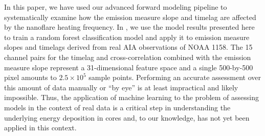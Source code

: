 In this paper, we have used our advanced forward modeling pipeline to systematically examine how the emission measure slope and timelag are affected by the nanoflare heating frequency. In , we use the model results presented here to train a random forest classification model and apply it to emission measure slopes and timelags derived from real AIA observations of NOAA 1158. The 15 channel pairs for the timelag and cross-correlation combined with the emission measure slope represent a 31-dimensional feature space and a single 500-by-500 pixel \AR{} amounts to $2.5\times10^5$ sample points. Performing an accurate assessment over this amount of data manually or ``by eye'' is at least impractical and likely impossible. Thus, the application of machine learning to the problem of assessing models in the context of real data is a critical step in understanding the underlying energy deposition in \AR{} cores and, to our knowledge, has not yet been applied in this context.  
